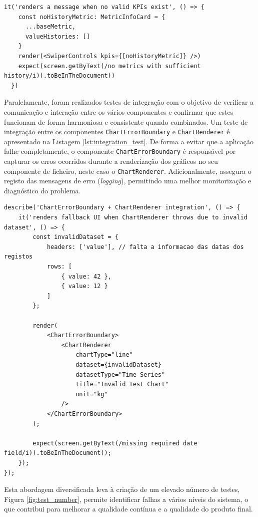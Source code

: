 \begin{lstlisting}[style=customts, caption={Teste unitáro ao componente \texttt{SwiperControls}}, label={lst:unit_test}]
it('renders a message when no valid KPIs exist', () => {
    const noHistoryMetric: MetricInfoCard = {
      ...baseMetric,
      valueHistories: []
    }
    render(<SwiperControls kpis={[noHistoryMetric]} />)
    expect(screen.getByText(/no metrics with sufficient history/i)).toBeInTheDocument()
  })
\end{lstlisting}

Paralelamente, foram realizados testes de integração com o objetivo de verificar a comunicação e interação entre os vários componentes e confirmar que estes funcionam de forma harmoniosa e consistente quando combinados. Um teste de integração entre os componentes \texttt{ChartErrorBoundary} e \texttt{ChartRenderer} é apresentado na Listagem \ref{lst:integration_test}. De forma a evitar que a aplicação falhe completamente, o componente \texttt{ChartErrorBoundary} é responsável por capturar os erros ocorridos durante a renderização dos gráficos no seu componente de ficheiro, neste caso o \texttt{ChartRenderer}. Adicionalmente, assegura o registo das mensagens de erro (\textit{logging}), permitindo uma melhor monitorização e diagnóstico do problema.

\begin{lstlisting}[style=customts, caption={Teste de integração entre o componente \texttt{ChartErrorBoundary} e \texttt{ChartRenderer}}, label={lst:integration_test}]
describe('ChartErrorBoundary + ChartRenderer integration', () => {
    it('renders fallback UI when ChartRenderer throws due to invalid dataset', () => {
        const invalidDataset = {
            headers: ['value'], // falta a informacao das datas dos registos
            rows: [
                { value: 42 },
                { value: 12 }
            ]
        };

        render(
            <ChartErrorBoundary>
                <ChartRenderer
                    chartType="line"
                    dataset={invalidDataset}
                    datasetType="Time Series"
                    title="Invalid Test Chart"
                    unit="kg"
                />
            </ChartErrorBoundary>
        );

        expect(screen.getByText(/missing required date field/i)).toBeInTheDocument();
    });
});
\end{lstlisting}

Esta abordagem diversificada leva à criação de um elevado número de testes, Figura \ref{fig:test_number}, permite identificar falhas a vários níveis do sistema, o que contribui para melhorar a qualidade contínua e a qualidade do produto final.

